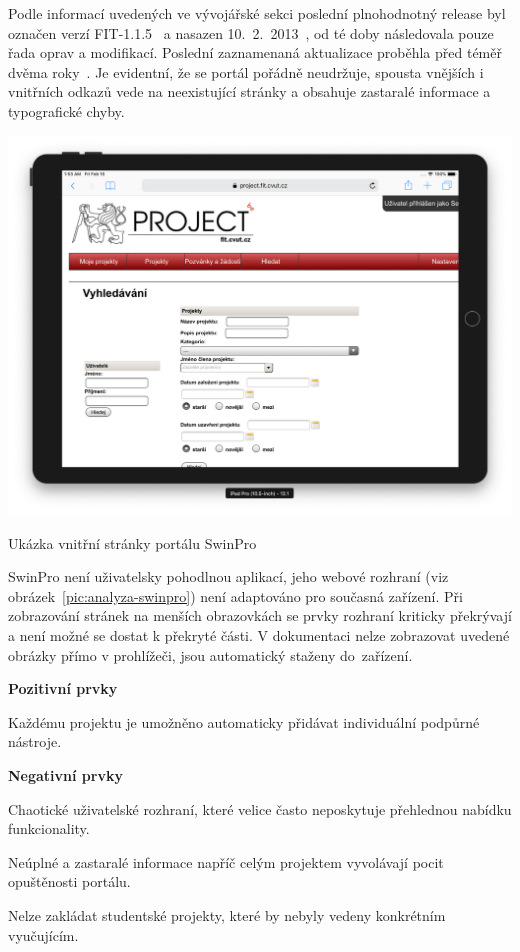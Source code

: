 Podle informací uvedených ve vývojářské sekci poslední plnohodnotný release byl označen verzí FIT-1.1.5~\cite{swinproDevpage} a nasazen 10.~2.~2013~\cite{swinproDevpage1645}, od té doby následovala pouze řada oprav a modifikací. Poslední zaznamenaná aktualizace proběhla před téměř dvěma roky~\cite{swinproDevpage1907}. Je evidentní, že se portál pořádně neudržuje, spousta vnějších i vnitřních odkazů vede na neexistující stránky a obsahuje zastaralé informace a typografické chyby.


\begin{fig:illustration}
   \includegraphics[width=1\textwidth]{images/analyza-swinpro.png}
   \caption{Ukázka vnitřní stránky portálu SwinPro}\label{pic:analyza-swinpro}
\end{fig:illustration}

\newpage
SwinPro není uživatelsky pohodlnou aplikací, jeho webové rozhraní (viz obrázek~\ref{pic:analyza-swinpro}) není adaptováno pro současná zařízení. Při zobrazování stránek na menších obrazovkách se prvky rozhraní kriticky překrývají a není možné se dostat k překryté části. V dokumentaci nelze zobrazovat uvedené obrázky přímo v prohlížeči, jsou automatický staženy do~zařízení.

\textbf{Pozitivní prvky}
\begin{ul}
   \item Každému projektu je umožněno automaticky přidávat individuální podpůrné nástroje.
\end{ul}

\textbf{Negativní prvky}
\begin{ul}
   \item Chaotické uživatelské rozhraní, které velice často neposkytuje přehlednou nabídku funkcionality.
   \item Neúplné a zastaralé informace napříč celým projektem vyvolávají pocit opuštěnosti portálu.
   \item Nelze zakládat studentské projekty, které by nebyly vedeny konkrétním vyučujícím.
\end{ul}


